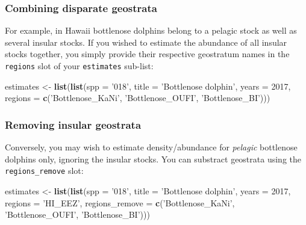 \documentclass[
]{book}
\newenvironment{Shaded}{\begin{snugshade}}{\end{snugshade}}
\newcommand{\DataTypeTok}[1]{\textcolor[rgb]{0.13,0.29,0.53}{#1}}
\newcommand{\DecValTok}[1]{\textcolor[rgb]{0.00,0.00,0.81}{#1}}
\newcommand{\KeywordTok}[1]{\textcolor[rgb]{0.13,0.29,0.53}{\textbf{#1}}}
\newcommand{\NormalTok}[1]{#1}
\newcommand{\StringTok}[1]{\textcolor[rgb]{0.31,0.60,0.02}{#1}}
\begin{document}
\hypertarget{combining-disparate-geostrata}{%
\subsubsection*{Combining disparate geostrata}\label{combining-disparate-geostrata}}

For example, in Hawaii bottlenose dolphins belong to a pelagic stock as well as several insular stocks. If you wished to estimate the abundance of all insular stocks together, you simply provide their respective geostratum names in the \texttt{regions} slot of your \texttt{estimates} sub-list:

\begin{Shaded}
\begin{Highlighting}[]
\NormalTok{estimates <-}\StringTok{ }\KeywordTok{list}\NormalTok{(}\KeywordTok{list}\NormalTok{(}\DataTypeTok{spp =} \StringTok{'018'}\NormalTok{,}
                       \DataTypeTok{title =} \StringTok{'Bottlenose dolphin'}\NormalTok{,}
                       \DataTypeTok{years =} \DecValTok{2017}\NormalTok{,}
                       \DataTypeTok{regions =} \KeywordTok{c}\NormalTok{(}\StringTok{'Bottlenose_KaNi'}\NormalTok{,}
                                   \StringTok{'Bottlenose_OUFI'}\NormalTok{,}
                                   \StringTok{'Bottlenose_BI'}\NormalTok{)))}
\end{Highlighting}
\end{Shaded}

\hypertarget{removing-insular-geostrata}{%
\subsubsection*{Removing insular geostrata}\label{removing-insular-geostrata}}

Conversely, you may wish to estimate density/abundance for \emph{pelagic} bottlenose dolphins only, ignoring the insular stocks. You can substract geostrata using the \texttt{regions\_remove} slot:

\begin{Shaded}
\begin{Highlighting}[]
\NormalTok{estimates <-}\StringTok{ }\KeywordTok{list}\NormalTok{(}\KeywordTok{list}\NormalTok{(}\DataTypeTok{spp =} \StringTok{'018'}\NormalTok{,}
                       \DataTypeTok{title =} \StringTok{'Bottlenose dolphin'}\NormalTok{,}
                       \DataTypeTok{years =} \DecValTok{2017}\NormalTok{,}
                       \DataTypeTok{regions =} \StringTok{'HI_EEZ'}\NormalTok{,}
                       \DataTypeTok{regions_remove =} \KeywordTok{c}\NormalTok{(}\StringTok{'Bottlenose_KaNi'}\NormalTok{,}
                                          \StringTok{'Bottlenose_OUFI'}\NormalTok{,}
                                          \StringTok{'Bottlenose_BI'}\NormalTok{)))}
\end{Highlighting}
\end{Shaded}
\end{document}
